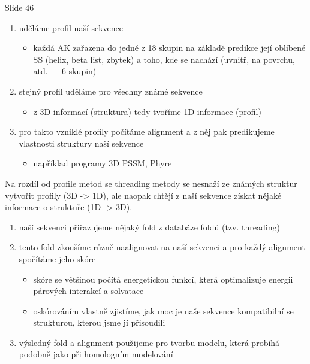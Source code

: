 \documentclass[DIV=8]{scrreprt}
\begin{document}
Slide 46
\begin{enumerate}
    \item uděláme profil naší sekvence
\begin{itemize}
    \item každá AK zařazena do jedné z 18 skupin na základě predikce její oblíbené SS (helix, beta list, zbytek) a toho, kde se nachází (uvnitř, na povrchu, atd. --- 6 skupin)
\end{itemize}

    \item stejný profil uděláme pro všechny známé sekvence
\begin{itemize}
    \item z 3D informací (struktura) tedy tvoříme 1D informace (profil)
\end{itemize}

    \item pro takto vzniklé profily počítáme alignment a z něj pak predikujeme vlastnosti struktury naší sekvence
\begin{itemize}
    \item například programy 3D PSSM, Phyre
\end{itemize}

\end{enumerate}


Na rozdíl od profile metod se threading metody se nesnaží ze známých struktur vytvořit profily (3D -> 1D), ale naopak chtějí z naší sekvence získat nějaké informace o struktuře (1D -> 3D).

\begin{enumerate}
    \item naší sekvenci přiřazujeme nějaký fold z databáze foldů (tzv. threading)
    \item tento fold zkoušíme různě naalignovat na naší sekvenci a pro každý alignment spočítáme jeho skóre
\begin{itemize}
    \item skóre se většinou počítá energetickou funkcí, která optimalizuje energii párových interakcí a solvatace
    \item oskórováním vlastně zjistíme, jak moc je naše sekvence kompatibilní se strukturou, kterou jsme jí přisoudili
\end{itemize}

    \item výsledný fold a alignment použijeme pro tvorbu modelu, která probíhá podobně jako při homologním modelování
\end{enumerate}
\end{document}
